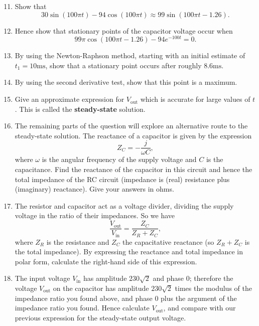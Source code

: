 \documentclass{article}
\begin{document}
\begin{enumerate}\setcounter{enumi}{10}
	\item Show that
		\[30\sin(100\pi t)-94\cos(100\pi t)\approx 99\sin(100\pi t-1.26).\]
	\item Hence show that stationary points of the capacitor voltage occur when
		\[99\pi\cos(100\pi t-1.26)-94e^{-100t}=0.\]
	\item By using the Newton-Raphson method, starting with an initial estimate of $t_1=10\mathrm{ms}$, show that a stationary point occurs after roughly $8.6\mathrm{ms}$.
	\item By using the second derivative test, show that this point is a maximum.
	\item Give an approximate expression for $V_\mathrm{out}$ which is accurate for large values of $t$. This is called the \textbf{steady-state} solution.
	\item The remaining parts of the question will explore an alternative route to the steady-state solution. The reactance of a capacitor is given by the expression
		\[Z_C=-\frac{j}{\omega C},\]
		where $\omega$ is the angular frequency of the supply voltage and $C$ is the capacitance. Find the reactance of the capacitor in this circuit and hence the total impedance of the RC circuit (impedance is (real) resistance plus (imaginary) reactance). Give your answers in ohms.
	\item The resistor and capacitor act as a voltage divider, dividing the supply voltage in the ratio of their impedances. So we have
		\[\frac{V_\mathrm{out}}{V_\mathrm{in}}=\frac{Z_C}{Z_R+Z_C},\]
		where $Z_R$ is the resistance and $Z_C$ the capacitative reactance (so $Z_R+Z_C$ is the total impedance). By expressing the reactance and total impedance in polar form, calculate the right-hand side of this expression.
	\item The input voltage $V_\mathrm{in}$ has amplitude $230\sqrt{2}$ and phase $0$; therefore the voltage $V_\mathrm{out}$ on the capacitor has amplitude $230\sqrt{2}$ times the modulus of the impedance ratio you found above, and phase $0$ plus the argument of the impedance ratio you found. Hence calculate $V_\mathrm{out}$, and compare with our previous expression for the steady-state output voltage.
\end{enumerate}
\end{document}
